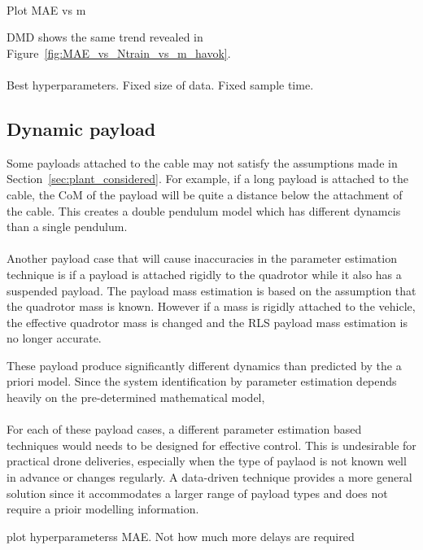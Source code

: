         \paragraph{}
        Plot MAE vs m
        
        DMD shows the same trend revealed in Figure~\ref{fig:MAE_vs_Ntrain_vs_m_havok}.

        \paragraph{}

        Best hyperparameters.
        Fixed size of data.
        Fixed sample time.

    \subsection{Dynamic payload}
        Some payloads attached to the cable may not satisfy the assumptions made in Section~\ref{sec:plant_considered}.
        For example, if a long payload is attached to the cable, the CoM of the payload will be quite a distance below the attachment of the cable.
        This creates a double pendulum model which has different dynamcis than a single pendulum.

        \paragraph{}
        Another payload case that will cause inaccuracies in the parameter estimation technique is if a payload is attached rigidly to the quadrotor while it also has a suspended payload.
        The payload mass estimation is based on the assumption that the quadrotor mass is known.
        However if a mass is rigidly attached to the vehicle, the effective quadrotor mass is changed and the RLS payload mass estimation is no longer accurate.

        These payload produce significantly different dynamics than predicted by the a priori model.
        Since the system identification by parameter estimation depends heavily on the pre-determined mathematical model,
        
        \paragraph{}
        For each of these payload cases, a different parameter estimation based techniques would needs to be designed for effective control.
        This is undesirable for practical drone deliveries, especially when the type of paylaod is not known well in advance or changes regularly.
        A data-driven technique provides a more general solution since it accommodates a larger range of payload types and does not require a prioir modelling information.
        
        plot hyperparameterss MAE. Not how much more delays are required
